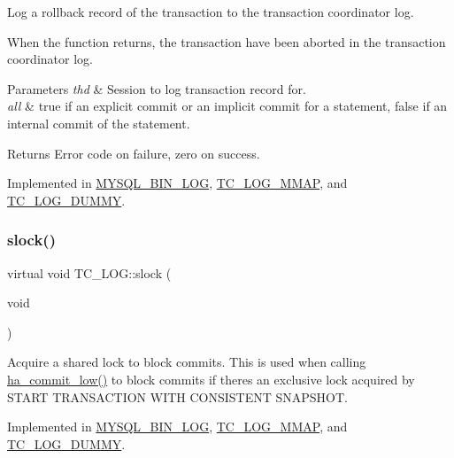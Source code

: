Log a rollback record of the transaction to the transaction coordinator log.

When the function returns, the transaction have been aborted in the transaction coordinator log.


\begin{DoxyParams}{Parameters}
{\em thd} & Session to log transaction record for.\\
\hline
{\em all} & {\ttfamily true} if an explicit commit or an implicit commit for a statement, {\ttfamily false} if an internal commit of the statement.\\
\hline
\end{DoxyParams}
\begin{DoxyReturn}{Returns}
Error code on failure, zero on success. 
\end{DoxyReturn}


Implemented in \mbox{\hyperlink{group__Binary__Log_ga9590d29210bd03fce1b8f9effc7c2d2a}{M\+Y\+S\+Q\+L\+\_\+\+B\+I\+N\+\_\+\+L\+OG}}, \mbox{\hyperlink{classTC__LOG__MMAP_a5a050951b50e08417abbec375ab30614}{T\+C\+\_\+\+L\+O\+G\+\_\+\+M\+M\+AP}}, and \mbox{\hyperlink{classTC__LOG__DUMMY_af37509e3086560c3d057a0c43b67a238}{T\+C\+\_\+\+L\+O\+G\+\_\+\+D\+U\+M\+MY}}.

\mbox{\label{classTC__LOG_a5b73af1ad12c691b3417c565f7e58a1c}} 
\subsubsection{\texorpdfstring{slock()}{slock()}}
{\footnotesize\ttfamily virtual void T\+C\+\_\+\+L\+O\+G\+::slock (\begin{DoxyParamCaption}\item[{void}]{ }\end{DoxyParamCaption})\hspace{0.3cm}{\ttfamily [pure virtual]}}

Acquire a shared lock to block commits. This is used when calling \mbox{\hyperlink{handler_8cc_a4a77fdd0e1d6bee79e29e7495c7d752a}{ha\+\_\+commit\+\_\+low()}} to block commits if there\textquotesingle{}s an exclusive lock acquired by S\+T\+A\+RT T\+R\+A\+N\+S\+A\+C\+T\+I\+ON W\+I\+TH C\+O\+N\+S\+I\+S\+T\+E\+NT S\+N\+A\+P\+S\+H\+OT. 

Implemented in \mbox{\hyperlink{classMYSQL__BIN__LOG_a189bd79b457e303f7c6ef936e3c932cf}{M\+Y\+S\+Q\+L\+\_\+\+B\+I\+N\+\_\+\+L\+OG}}, \mbox{\hyperlink{classTC__LOG__MMAP_a8c90387699139f5e9d244e60c5a126a1}{T\+C\+\_\+\+L\+O\+G\+\_\+\+M\+M\+AP}}, and \mbox{\hyperlink{classTC__LOG__DUMMY_a144eb01c40fb75ae3a1c04609dc89ea3}{T\+C\+\_\+\+L\+O\+G\+\_\+\+D\+U\+M\+MY}}.

